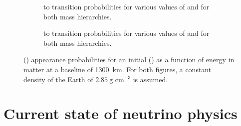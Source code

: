 \begin{figure}[h]
  \centering
  \begin{subfigure}[t]{0.49\textwidth}
    \begin{adjustbox}{max totalsize={\textwidth}, center}
      
    \end{adjustbox}
    \caption{\numu to \nue transition probabilities for various values of \dcp and for both mass hierarchies.}
  \end{subfigure}
  \hfill
  \begin{subfigure}[t]{0.49\textwidth}
    \begin{adjustbox}{max totalsize={\textwidth}, center}
      
    \end{adjustbox}
    \caption{\anumu to \anue transition probabilities for various values of \dcp and for both mass hierarchies.}
  \end{subfigure}
  \caption{\nue(\anue) appearance probabilities for an initial \numu(\anumu) as a function of energy in matter at a baseline of 1300~km. For both figures, a constant density of the Earth of $2.85~\text{g~cm}^{-3}$ is assumed.}
  \label{fig:threeNuMatter}
\end{figure}

\section{Current state of neutrino physics}
\label{sec:theory:currentState}

